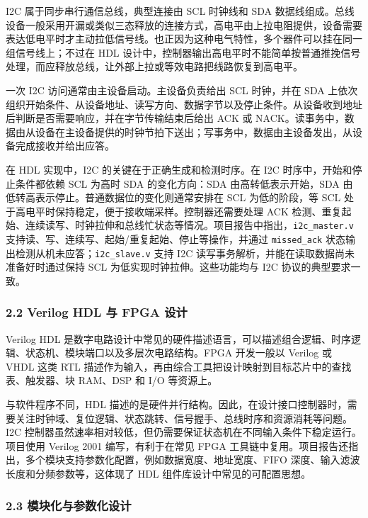 I2C 属于同步串行通信总线，典型连接由 SCL 时钟线和 SDA 数据线组成。总线设备一般采用开漏或类似三态释放的连接方式，高电平由上拉电阻提供，设备需要表达低电平时才主动拉低信号线。也正因为这种电气特性，多个器件可以挂在同一组信号线上；不过在 HDL 设计中，控制器输出高电平时不能简单按普通推挽信号处理，而应释放总线，让外部上拉或等效电路把线路恢复到高电平。

一次 I2C 访问通常由主设备启动。主设备负责给出 SCL 时钟，并在 SDA 上依次组织开始条件、从设备地址、读写方向、数据字节以及停止条件。从设备收到地址后判断是否需要响应，并在字节传输结束后给出 ACK 或 NACK。读事务中，数据由从设备在主设备提供的时钟节拍下送出；写事务中，数据由主设备发出，从设备完成接收并给出应答。

在 HDL 实现中，I2C 的关键在于正确生成和检测时序。在 I2C 时序中，开始和停止条件都依赖 SCL 为高时 SDA 的变化方向：SDA 由高转低表示开始，SDA 由低转高表示停止。普通数据位的变化则通常安排在 SCL 为低的阶段，等 SCL 处于高电平时保持稳定，便于接收端采样。控制器还需要处理 ACK 检测、重复起始、连续读写、时钟拉伸和总线忙状态等情况。项目报告中指出，\texttt{i2c\_master.v} 支持读、写、连续写、起始/重复起始、停止等操作，并通过 \texttt{missed\_ack} 状态输出检测从机未应答；\texttt{i2c\_slave.v} 支持 I2C 读写事务解析，并能在读取数据尚未准备好时通过保持 SCL 为低实现时钟拉伸。这些功能均与 I2C 协议的典型要求一致。

\subsubsection{2.2 Verilog HDL 与 FPGA 设计}\label{verilog-hdl-ux4e0e-fpga-ux8bbeux8ba1}

Verilog HDL 是数字电路设计中常见的硬件描述语言，可以描述组合逻辑、时序逻辑、状态机、模块端口以及多层次电路结构。FPGA 开发一般以 Verilog 或 VHDL 这类 RTL 描述作为输入，再由综合工具把设计映射到目标芯片中的查找表、触发器、块 RAM、DSP 和 I/O 等资源上。

与软件程序不同，HDL 描述的是硬件并行结构。因此，在设计接口控制器时，需要关注时钟域、复位逻辑、状态跳转、信号握手、总线时序和资源消耗等问题。I2C 控制器虽然速率相对较低，但仍需要保证状态机在不同输入条件下稳定运行。项目使用 Verilog 2001 编写，有利于在常见 FPGA 工具链中复用。项目报告还指出，多个模块支持参数化配置，例如数据宽度、地址宽度、FIFO 深度、输入滤波长度和分频参数等，这体现了 HDL 组件库设计中常见的可配置思想。

\subsubsection{2.3 模块化与参数化设计}\label{ux6a21ux5757ux5316ux4e0eux53c2ux6570ux5316ux8bbeux8ba1}

